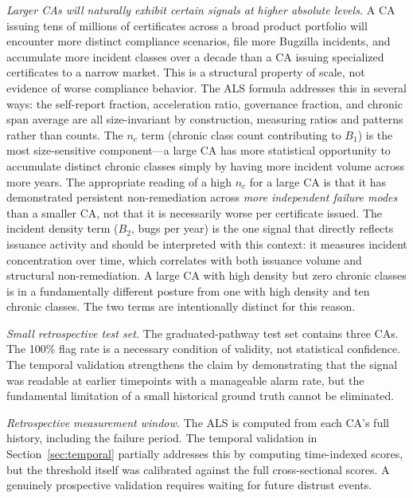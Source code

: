 \documentclass[10pt,twocolumn,letterpaper]{article}
\begin{document}
\textit{Larger CAs will naturally exhibit certain signals at higher absolute levels.}
A CA issuing tens of millions of certificates across a broad product portfolio will
encounter more distinct compliance scenarios, file more Bugzilla incidents, and
accumulate more incident classes over a decade than a CA issuing specialized certificates
to a narrow market. This is a structural property of scale, not evidence of worse
compliance behavior. The ALS formula addresses this in several ways: the self-report
fraction, acceleration ratio, governance fraction, and chronic span average are all
size-invariant by construction, measuring ratios and patterns rather than counts. The
$n_c$ term (chronic class count contributing to $B_1$) is the most size-sensitive
component---a large CA has more statistical opportunity to accumulate distinct chronic
classes simply by having more incident volume across more years. The appropriate reading
of a high $n_c$ for a large CA is that it has demonstrated persistent non-remediation
across \textit{more independent failure modes} than a smaller CA, not that it is
necessarily worse per certificate issued. The incident density term ($B_2$, bugs per
year) is the one signal that directly reflects issuance activity and should be
interpreted with this context: it measures incident concentration over time, which
correlates with both issuance volume and structural non-remediation. A large CA with
high density but zero chronic classes is in a fundamentally different posture from one
with high density and ten chronic classes. The two terms are intentionally distinct for
this reason.

\textit{Small retrospective test set.} The graduated-pathway test set contains three CAs.
The 100\% flag rate is a necessary condition of validity, not statistical confidence.
The temporal validation strengthens the claim by demonstrating that the signal was
readable at earlier timepoints with a manageable alarm rate, but the fundamental
limitation of a small historical ground truth cannot be eliminated.

\textit{Retrospective measurement window.} The ALS is computed from each CA's full
history, including the failure period. The temporal validation in
Section~\ref{sec:temporal} partially addresses this by computing time-indexed scores,
but the threshold itself was calibrated against the full cross-sectional scores. A
genuinely prospective validation requires waiting for future distrust events.
\end{document}
